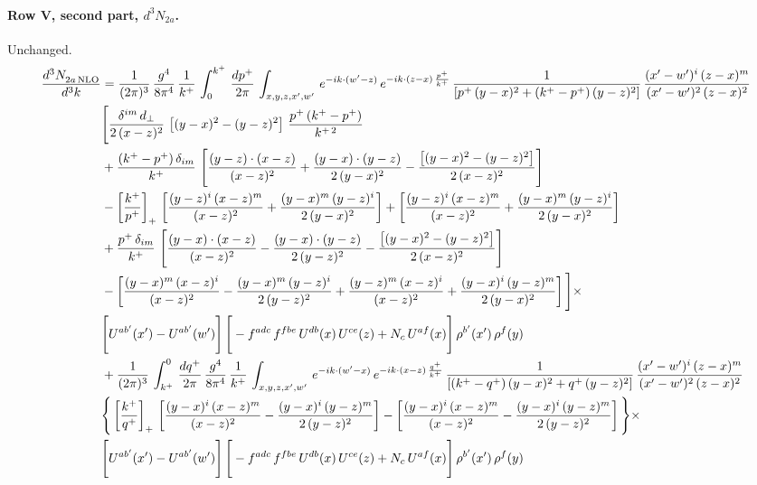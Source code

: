 \documentclass[10pt]{article}
\numberwithin{equation}{section}
\begin{document}
\paragraph{Row V, second part, $d^3N_{2a}$.}
Unchanged.
\begin{align}
    \frac{d^{3}N_{2a\,\rm NLO}^{\rm}}{d^{3}k}  & =   \frac{1}{(2\pi)^{3}}\, \frac{g^{4}}{8\pi^{4}}\,\frac{1}{k^{+}}\,\int_{0}^{k^{+}}\, \frac{dp^{+}}{2\pi}\,\int_{x,y,z,x',w'}\,e^{-ik\cdot(w'-z)}\,e^{-ik\cdot (z-x)\,\frac{p^{+}}{k^{+}}}\,\frac{1}{\left[p^{+}\,(y-x)^{2}+(k^{+}-p^{+})\,(y-z)^{2}\right]}\, \frac{(x'-w')^{i}\,(z-x)^{m}}{(x'-w')^{2}\,(z-x)^{2}} \notag \\ & \Bigg[\frac{\delta^{im}\,d_{\perp}}{2\,(x-z)^{2}}\,\left[(y-x)^{2}-(y-z)^{2}\right]\,\frac{p^{+}\,(k^{+}-p^{+})}{k^{+\,2}}\notag \\ & +\frac{(k^{+}-p^{+})\,\delta_{im}}{k^{+}}\,\left[\frac{(y-z)\cdot (x-z)}{(x-z)^{2}}+\frac{(y-x)\cdot (y-z)}{2\,(y-x)^{2}}-\frac{\left[(y-x)^{2}-(y-z)^{2}\right]}{2\,(x-z)^{2}}\right]\notag \\ & -\left[\frac{k^{+}}{p^{+}}\right]_{+}\,\left[\frac{(y-z)^{i}\,(x-z)^{m}}{(x-z)^{2}}+\frac{(y-x)^{m}\,(y-z)^{i}}{2\,(y-x)^{2}}\right]+ \left[\frac{(y-z)^{i}\,(x-z)^{m}}{(x-z)^{2}}+\frac{(y-x)^{m}\,(y-z)^{i}}{2\,(y-x)^{2}}\right]\notag \\ & +\frac{p^{+}\,\delta_{im}}{k^{+}}\,\left[\frac{(y-x)\cdot (x-z)}{(x-z)^{2}}-\frac{(y-x)\cdot (y-z)}{2\,(y-z)^{2}}-\frac{\left[(y-x)^{2}-(y-z)^{2}\right]}{2\,(x-z)^{2}}\right]\notag \\ &-\left[\frac{(y-x)^{m}\,(x-z)^{i}}{(x-z)^{2}}-\frac{(y-x)^{m}\,(y-z)^{i}}{2\,(y-z)^{2}}+\frac{(y-z)^{m}\,(x-z)^{i}}{(x-z)^{2}}+\frac{(y-x)^{i}\,(y-z)^{m}}{2\,(y-x)^{2}}\right]\Bigg]\times \notag \\ & \Bigg[U^{ab'}(x')-U^{ab'}(w')\Bigg]\,\Bigg[-f^{adc}\,f^{fbe}\,U^{db}(x)\,U^{ce}(z)+N_{c}\,U^{af}(x)\Bigg]\,\rho^{b'}(x')\,\rho^{f}(y) \notag \\
& + \frac{1}{(2\pi)^{3}}\,\int^{0}_{k^{+}}\, \frac{dq^{+}}{2\pi} \,\frac{g^{4}}{8\pi^{4}}\,\frac{1}{k^{+}}\, \int_{x,y,z,x',w'}\,e^{-ik\cdot(w'-x)}\,e^{-ik\cdot (x-z)\,\frac{q^{+}}{k^{+}}}\, \frac{1}{\left[(k^{+}-q^{+})\,(y-x)^{2}+q^{+}\,(y-z)^{2}\right]}\, \frac{(x'-w')^{i}\,(z-x)^{m}}{(x'-w')^{2}\,(z-x)^{2}} \notag \\ &\Bigg\{\left[\frac{k^{+}}{q^{+}}\right]_{+}\,\left[\frac{(y-x)^{i}\,(x-z)^{m}}{(x-z)^{2}}-\frac{(y-x)^{i}\,(y-z)^{m}}{2\,(y-z)^{2}}\right] -\left[\frac{(y-x)^{i}\,(x-z)^{m}}{(x-z)^{2}}-\frac{(y-x)^{i}\,(y-z)^{m}}{2\,(y-z)^{2}}\right]\Bigg\}\times\,\notag \\ & \Bigg[U^{ab'}(x')-U^{ab'}(w')\Bigg]\,\Bigg[-f^{adc}\,f^{fbe}\,U^{db}(x)\,U^{ce}(z)+N_{c}\,U^{af}(x)\Bigg]\,\rho^{b'}(x')\,\rho^{f}(y) \label{eq:F:G1V2a}
\end{align}
\end{document}
